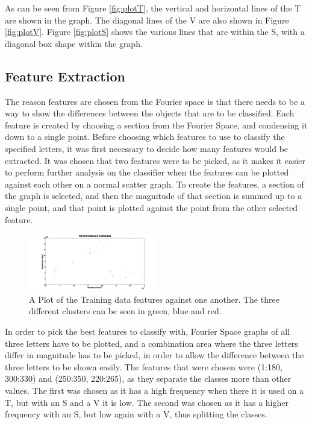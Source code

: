 \documentclass[a4paper]{article}
\begin{document}
As can be seen from Figure \ref{fig:plotT}, the vertical and horizontal lines of the T are shown in the graph. The diagonal lines of the V are also shown in Figure \ref{fig:plotV}. Figure \ref{fig:plotS} shows the various lines that are within the S, with a diagonal box shape within the graph. 
\subsection{Feature Extraction}
The reason features are chosen from the Fourier space is that there needs to be a way to show the differences between the objects that are to be classified. Each feature is created by choosing a section from the Fourier Space, and condensing it down to a single point. Before choosing which features to use to classify the specified letters, it was first necessary to decide how many features would be extracted. It was chosen that two features were to be picked, as it makes it easier to perform further analysis on the classifier when the features can be plotted against each other on a normal scatter graph. 
To create the features, a section of the graph is selected, and then the magnitude of that section is summed up to a single point, and that point is plotted against the point from the other selected feature.
\begin{figure}[H]
\centering
\includegraphics[width=0.5\textwidth]{plottrain.png}
\caption{\label{fig:plottrain}A Plot of the Training data features against one another. The three different clusters can be seen in green, blue and red.}
\end{figure}
In order to pick the best features to classify with, Fourier Space graphs of all three letters have to be plotted, and a combination area where the three letters differ in magnitude has to be picked, in order to allow the difference between the three letters to be shown easily. The features that were chosen were (1:180, 300:330) and (250:350, 220:265), as they separate the classes more than other values. The first was chosen as it has a high frequency when there it is used on a T, but with an S and a V it is low. The second was chosen as it has a higher frequency with an S, but low again with a V, thus splitting the classes. 
\end{document}
